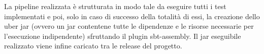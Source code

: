     La pipeline realizzata è strutturata in modo tale da eseguire tutti i test implementati e poi, solo in caso di successo della totalità di essi, la creazione dello uber jar (ovvero un jar contentene tutte le dipendenze e le risorse necessarie per l'esecuzione indipendente) sfruttando il plugin sbt-assembly. Il jar eseguibile realizzato viene infine caricato tra le release del progetto.







